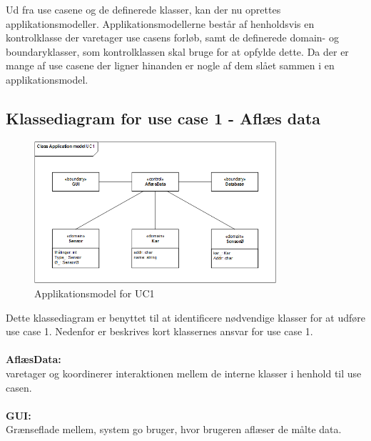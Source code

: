 Ud fra use casene og de definerede klasser, kan der nu oprettes applikationsmodeller. Applikationsmodellerne
består af henholdsvis en kontrolklasse der varetager use casens forløb, samt de definerede domain-
og boundaryklasser, som kontrolklassen skal bruge for at opfylde dette. Da der er mange af use casene der ligner hinanden er nogle af dem slået sammen i en applikationsmodel. 


\subsection{Klassediagram for use case 1 - Aflæs data}

\begin{figure}[H]
    \centering
    \includegraphics[width=0.8\textwidth]{Systemarkitektur/KlasseDiagrammer/1_AflaesData.PNG}
    \caption{Applikationsmodel for UC1}
    \label{fig:app_uc1}
\end{figure}

Dette klassediagram er benyttet til at identificere nødvendige klasser for at udføre use case 1.
Nedenfor er beskrives kort klassernes ansvar for use case 1.
\\\\
\textbf{AflæsData:}\\
varetager og koordinerer interaktionen mellem de interne klasser i henhold til use casen.
\\\\
\textbf{GUI:}\\
Grænseflade mellem, system go bruger, hvor brugeren aflæser de målte data. 
\\\\

